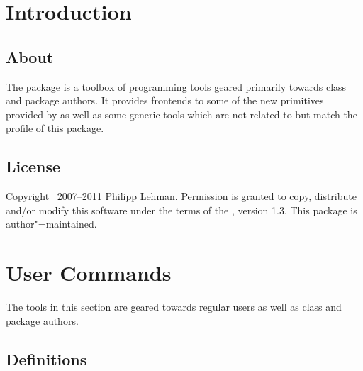 \documentclass{ltxdockit}[2010/09/26]
\begin{document}
\printtitlepage
\tableofcontents

\section{Introduction}
\label{int}

\subsection[About]{About }

The  package is a toolbox of programming tools geared primarily towards \latex class and package authors. It provides \latex frontends to some of the new primitives provided by \etex as well as some generic tools which are not related to \etex but match the profile of this package.

\subsection{License}

Copyright \textcopyright\ 2007--2011 Philipp Lehman. Permission is granted to copy, distribute and\slash or modify this software under the terms of the \lppl, version 1.3. This package is author"=maintained.

\section{User Commands}
\label{use}

The tools in this section are geared towards regular users as well as class and package authors.

\subsection{Definitions}
\label{use:def}
\end{document}
